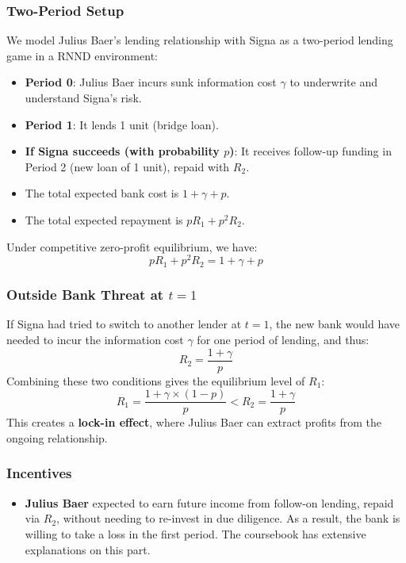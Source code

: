 \subsubsection*{Two-Period Setup}
We model Julius Baer's lending relationship with Signa as a two-period lending game in a RNND environment:
\begin{itemize}
    \item \textbf{Period 0}: Julius Baer incurs sunk information cost $\gamma$ to underwrite and understand Signa's risk.
    \item \textbf{Period 1}: It lends 1 unit (bridge loan).
    \item \textbf{If Signa succeeds (with probability $p$)}: It receives follow-up funding in Period 2 (new loan of 1 unit), repaid with $R_2$.
    \item The total expected bank cost is $1 + \gamma + p$.
    \item The total expected repayment is $pR_1 + p^2R_2$.
\end{itemize}
Under competitive zero-profit equilibrium, we have:
\begin{equation}
    pR_1 + p^2R_2 = 1 + \gamma + p \tag{3.23 of coursebook}
\end{equation}

\subsubsection*{Outside Bank Threat at $t = 1$}
If Signa had tried to switch to another lender at $t = 1$, the new bank would have needed to incur the information cost $\gamma$ for one period of lending, and thus:
\begin{equation}
    R_2 = \frac{1 + \gamma}{p} \tag{3.24 of coursebook}
\end{equation}
Combining these two conditions gives the equilibrium level of $R_1$:
\begin{equation}
    R_1 = \frac{1 + \gamma \times(1-p)}{p} < R_2 = \frac{1 + \gamma}{p}
\end{equation}
This creates a \textbf{lock-in effect}, where Julius Baer can extract profits from the ongoing relationship.

\subsubsection*{Incentives}
\begin{itemize}
    \item \textbf{Julius Baer} expected to earn future income from follow-on lending, repaid via $R_2$, without needing to re-invest in due diligence. As a result, the bank is willing to take a loss in the first period. The coursebook has extensive explanations on this part.
\end{itemize}

